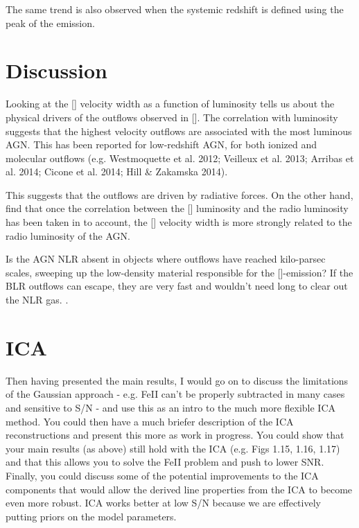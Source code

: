 The same trend is also observed when the systemic redshift is defined using the peak of the \hb emission. 

\section{Discussion}

Looking at the [] velocity width as a function of luminosity tells us about the physical drivers of the outflows observed in []. 
The correlation with luminosity suggests that the highest velocity outflows are associated with the most luminous AGN. 
This has been reported for low-redshift AGN, for both ionized and molecular outflows (e.g. Westmoquette et al. 2012; Veilleux et al. 2013; Arribas et al. 2014; Cicone et al. 2014; Hill \& Zakamska 2014).

This suggests that the outflows are driven by radiative forces. 
On the other hand, \citet{mullaney13} find that once the correlation between the [] luminosity and the radio luminosity has been taken in to account, the [] velocity width is more strongly related to the radio luminosity of the AGN. 

Is the AGN NLR absent in objects where outflows have reached kilo-parsec scales, sweeping up the low-density material responsible for the []-emission?
If the BLR outflows can escape, they are very fast and wouldn't need long to clear out the NLR gas. 
. 

\section{ICA}

Then having presented the main results, I would go on to discuss the limitations of the Gaussian approach - e.g. FeII can't be properly subtracted in many cases and sensitive to S/N - and use this as an intro to the much more flexible ICA method. 
You could then have a much briefer description of the ICA reconstructions and present this more as work in progress. 
You could show that your main results (as above) still hold with the ICA (e.g. Figs 1.15, 1.16, 1.17) and that this allows you to solve the FeII problem and push to lower SNR. 
Finally, you could discuss some of the potential improvements to the ICA components that would allow the derived line properties from the ICA to become even more robust. 
ICA works better at low S/N because we are effectively putting priors on the model parameters. 

